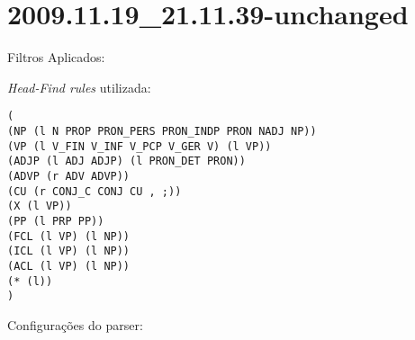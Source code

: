 \section{2009.11.19_21.11.39-unchanged} %
\label{sec:exp:2009.11.19_21.11.39-unchanged}

Filtros Aplicados:

\begin{itemize}
  
\end{itemize}

\emph{Head-Find rules} utilizada:

\scriptsize
\begin{verbatim}
(
(NP (l N PROP PRON_PERS PRON_INDP PRON NADJ NP))
(VP (l V_FIN V_INF V_PCP V_GER V) (l VP))
(ADJP (l ADJ ADJP) (l PRON_DET PRON))
(ADVP (r ADV ADVP))
(CU (r CONJ_C CONJ CU , ;))
(X (l VP))
(PP (l PRP PP))
(FCL (l VP) (l NP))
(ICL (l VP) (l NP))
(ACL (l VP) (l NP))
(* (l))
)

\end{verbatim}

\normalsize

Configurações do parser:

